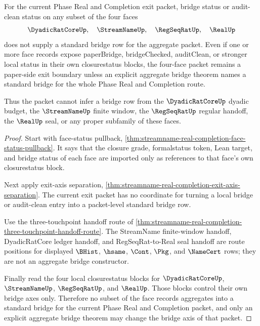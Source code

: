 \begin{theorem}
\label{thm:streamname-real-completion-bridge-nonaggregation}
For the current Phase Real and Completion exit packet, bridge status or audit-clean status on any subset of the four faces
$$
\DyadicRatCoreUp,\quad \StreamNameUp,\quad \RegSeqRatUp,\quad \RealUp
$$
does not supply a standard bridge row for the aggregate packet. Even if one or more face records expose paperBridge, bridgeChecked, auditClean, or stronger local status in their own closurestatus blocks, the four-face packet remains a paper-side exit boundary unless an explicit aggregate bridge theorem names a standard bridge for the whole Phase Real and Completion route.

Thus the packet cannot infer a bridge row from the $\DyadicRatCoreUp$ dyadic budget, the $\StreamNameUp$ finite window, the $\RegSeqRatUp$ regular handoff, the $\RealUp$ seal, or any proper subfamily of these faces.
\end{theorem}
\begin{proof}
Start with face-status pullback, \autoref{thm:streamname-real-completion-face-status-pullback}. It says that the closure grade, formalstatus token, Lean target, and bridge status of each face are imported only as references to that face's own closurestatus block.

Next apply exit-axis separation, \autoref{thm:streamname-real-completion-exit-axis-separation}. The current exit packet has no coordinate for turning a local bridge or audit-clean entry into a packet-level standard bridge row.

Use the three-touchpoint handoff route of \autoref{thm:streamname-real-completion-three-touchpoint-handoff-route}. The StreamName finite-window handoff, DyadicRatCore ledger handoff, and RegSeqRat-to-Real seal handoff are route positions for displayed $\BHist$, $\hsame$, $\Cont$, $\Pkg$, and $\NameCert$ rows; they are not an aggregate bridge constructor.

Finally read the four local closurestatus blocks for $\DyadicRatCoreUp$, $\StreamNameUp$, $\RegSeqRatUp$, and $\RealUp$. Those blocks control their own bridge axes only. Therefore no subset of the face records aggregates into a standard bridge for the current Phase Real and Completion packet, and only an explicit aggregate bridge theorem may change the bridge axis of that packet.
\end{proof}

